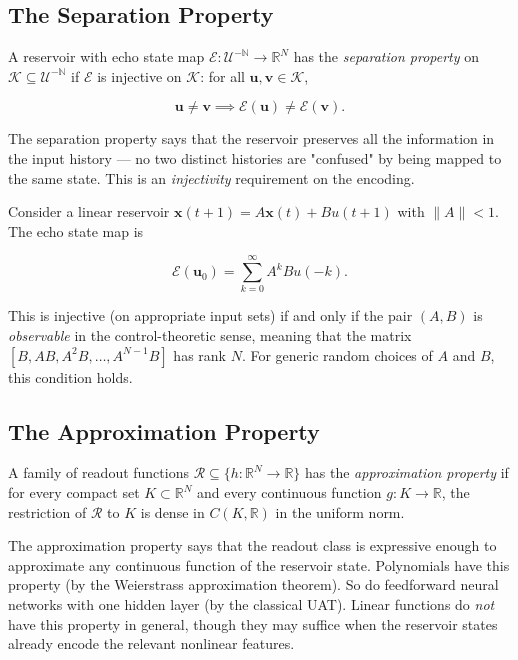 \subsection{The Separation Property}\label{sec:15.4.1}

\begin{definition}\label{def:15.9}
A reservoir with echo state map
$\mathcal{E}: \mathcal{U}^{-\mathbb{N}} \to \mathbb{R}^N$ has the \textit{separation property}
on $\mathcal{K} \subseteq \mathcal{U}^{-\mathbb{N}}$ if $\mathcal{E}$ is injective on
$\mathcal{K}$: for all $\mathbf{u}, \mathbf{v} \in \mathcal{K}$,

\[
\mathbf{u} \neq \mathbf{v} \implies \mathcal{E}(\mathbf{u}) \neq \mathcal{E}(\mathbf{v}).
\]

The separation property says that the reservoir preserves all the information in the
input history --- no two distinct histories are "confused" by being mapped to the same
state. This is an \textit{injectivity} requirement on the encoding.
\end{definition}


\begin{example}
Consider a linear reservoir $\mathbf{x}(t+1) = A\mathbf{x}(t) + Bu(t+1)$
with $\|A\| < 1$. The echo state map is

\[
\mathcal{E}(\mathbf{u}_0) = \sum_{k=0}^{\infty} A^k B u(-k).
\]

This is injective (on appropriate input sets) if and only if the pair $(A, B)$ is
\textit{observable} in the control-theoretic sense, meaning that the matrix
$[B, AB, A^2B, \ldots, A^{N-1}B]$ has rank $N$. For generic random choices of $A$ and
$B$, this condition holds.
\end{example}


\subsection{The Approximation Property}\label{sec:15.4.2}

\begin{definition}\label{def:15.11}
A family of readout functions
$\mathcal{R} \subseteq \{h: \mathbb{R}^N \to \mathbb{R}\}$ has the \textit{approximation property}
if for every compact set $K \subset \mathbb{R}^N$ and every continuous function
$g: K \to \mathbb{R}$, the restriction of $\mathcal{R}$ to $K$ is dense in $C(K, \mathbb{R})$
in the uniform norm.

The approximation property says that the readout class is expressive enough to
approximate any continuous function of the reservoir state. Polynomials have this
property (by the Weierstrass approximation theorem). So do feedforward neural
networks with one hidden layer (by the classical UAT). Linear functions do \textit{not}
have this property in general, though they may suffice when the reservoir states
already encode the relevant nonlinear features.
\end{definition}


